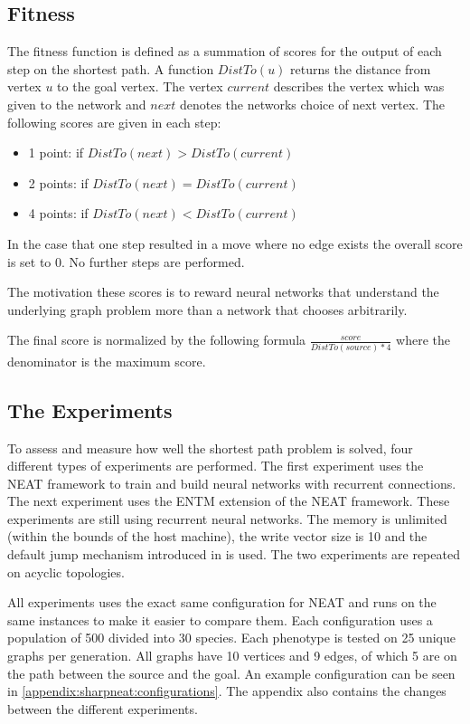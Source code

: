 \subsection{Fitness}
The fitness function is defined as a summation of scores for the output of each step on the shortest path. A function $ DistTo(u) $ returns the distance from vertex $ u $ to the goal vertex. The vertex $ current $ describes the vertex which was given to the network and $ next $ denotes the networks choice of next vertex. The following scores are given in each step:

\begin{itemize}
	\item[] 1 point: if $ DistTo(next) > DistTo(current) $
	\item[] 2 points: if $ DistTo(next) = DistTo(current) $
	\item[] 4 points: if $ DistTo(next) < DistTo(current) $
\end{itemize}

\noindent In the case that one step resulted in a move where no edge exists the overall score is set to 0. No further steps are performed.

\newpar The motivation these scores is to reward neural networks that understand the underlying graph problem more than a network that chooses arbitrarily.

\newpar The final score is normalized by the following formula $ \frac{score}{DistTo(source)*4} $ where the denominator is the  maximum score.

\subsection{The Experiments}
To assess and measure how well the shortest path problem is solved, four different types of experiments are performed. The first experiment uses the NEAT framework to train and build neural networks with recurrent connections. The next experiment uses the ENTM extension of the NEAT framework. These experiments are still using recurrent neural networks. The memory is unlimited (within the bounds of the host machine), the write vector size is 10 and the default jump mechanism introduced in \cite{luders2017continual} is used. The two experiments are repeated on acyclic topologies.

\newpar All experiments uses the exact same configuration for NEAT and runs on the same instances to make it easier to compare them. Each configuration uses a population of 500 divided into 30 species. Each phenotype is tested on 25 unique graphs per generation. All graphs have 10 vertices and 9 edges, of which 5 are on the path between the source and the goal. An example configuration can be seen in \autoref{appendix:sharpneat:configurations}. The appendix also contains the changes between the different experiments.